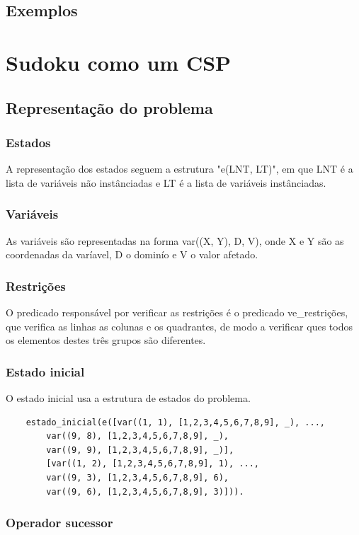 \documentclass{article}
\begin{document}
\subsection{Exemplos}

\newpage
\section{Sudoku como um CSP}
\subsection{Representação do problema}
\subsubsection{Estados}
A representação dos estados seguem a estrutura "e(LNT, LT)", em que LNT é a lista de variáveis não instânciadas e LT é a lista de variáveis instânciadas.

\subsubsection{Variáveis}
As variáveis são representadas na forma var((X, Y), D, V), onde X e Y são as coordenadas da varíavel, D o dominío e V o valor afetado.

\subsubsection{Restrições}
O predicado responsável por verificar as restrições é o predicado ve\_restrições, que verifica as linhas as colunas e os quadrantes, de modo a verificar ques todos os elementos destes três grupos são diferentes.

\subsubsection{Estado inicial}
O estado inicial usa a estrutura de estados do problema.

\begin{verbatim}
    estado_inicial(e([var((1, 1), [1,2,3,4,5,6,7,8,9], _), ..., 
        var((9, 8), [1,2,3,4,5,6,7,8,9], _), 
        var((9, 9), [1,2,3,4,5,6,7,8,9], _)],
        [var((1, 2), [1,2,3,4,5,6,7,8,9], 1), ..., 
        var((9, 3), [1,2,3,4,5,6,7,8,9], 6), 
        var((9, 6), [1,2,3,4,5,6,7,8,9], 3)])).
\end{verbatim}

\subsubsection{Operador sucessor}
\end{document}
